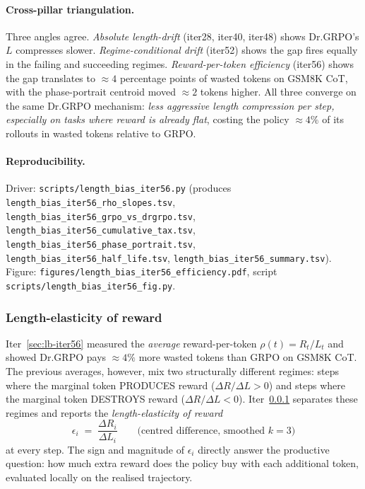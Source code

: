 \documentclass{article}
\begin{document}
\paragraph{Cross-pillar triangulation.}
Three angles agree. \emph{Absolute length-drift} (iter28, iter40, iter48)
shows Dr.GRPO's $L$ compresses slower. \emph{Regime-conditional drift}
(iter52) shows the gap fires equally in the failing and succeeding
regimes. \emph{Reward-per-token efficiency} (iter56) shows the gap
translates to $\approx 4$ percentage points of wasted tokens on GSM8K
CoT, with the phase-portrait centroid moved $\approx 2$ tokens higher.
All three converge on the same Dr.GRPO mechanism: \emph{less aggressive
length compression per step, especially on tasks where reward is
already flat}, costing the policy $\approx 4\%$ of its rollouts in
wasted tokens relative to GRPO.

\paragraph{Reproducibility.}
Driver: \texttt{scripts/length\_bias\_iter56.py} (produces
\texttt{length\_bias\_iter56\_rho\_slopes.tsv},
\texttt{length\_bias\_iter56\_grpo\_vs\_drgrpo.tsv},
\texttt{length\_bias\_iter56\_cumulative\_tax.tsv},
\texttt{length\_bias\_iter56\_phase\_portrait.tsv},
\texttt{length\_bias\_iter56\_half\_life.tsv},
\texttt{length\_bias\_iter56\_summary.tsv}).
Figure: \texttt{figures/length\_bias\_iter56\_efficiency.pdf},
script \texttt{scripts/length\_bias\_iter56\_fig.py}.
 

\subsubsection{Length-elasticity of reward}\label{sec:lb-iter60}

Iter~\ref{sec:lb-iter56} measured the \emph{average} reward-per-token
$\rho(t) = R_t / L_t$ and showed Dr.GRPO pays $\approx 4\%$ more wasted
tokens than GRPO on GSM8K CoT. The previous averages, however, mix two
structurally different regimes: steps where the marginal token PRODUCES
reward ($\Delta R / \Delta L > 0$) and steps where the marginal token
DESTROYS reward ($\Delta R / \Delta L < 0$). Iter~\ref{sec:lb-iter60}
separates these regimes and reports the \emph{length-elasticity of
reward}
\begin{equation}\label{eq:lb60-elasticity}
\epsilon_i \;=\; \frac{\Delta R_i}{\Delta L_i} \qquad\text{(centred difference, smoothed $k{=}3$)}
\end{equation}
at every step. The sign and magnitude of $\epsilon_i$ directly answer
the productive question: how much extra reward does the policy buy with
each additional token, evaluated locally on the realised trajectory.
\end{document}
